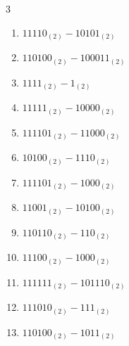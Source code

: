 \begin{multicols}{3}
\begin{enumerate}
\columnbreak %

  \item $11110_{(2)} - 10101_{(2)}$


  \item $110100_{(2)} - 100011_{(2)}$


  \item $1111_{(2)} - 1_{(2)}$


  \item $11111_{(2)} - 10000_{(2)}$


  \item $111101_{(2)} - 11000_{(2)}$


  \item $10100_{(2)} - 1110_{(2)}$


  \item $111101_{(2)} - 1000_{(2)}$


  \item $11001_{(2)} - 10100_{(2)}$


  \item $110110_{(2)} - 110_{(2)}$


  \item $11100_{(2)} - 1000_{(2)}$


\columnbreak %

\resetques

  \item $111111_{(2)} - 101110_{(2)}$


  \item $111010_{(2)} - 111_{(2)}$


  \item $110100_{(2)} - 1011_{(2)}$



\end{enumerate}
\end{multicols}
